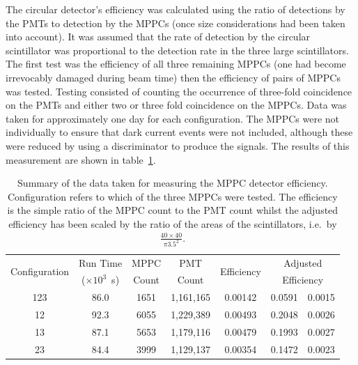 The circular detector's efficiency was calculated using the ratio of detections by the PMTs to detection by the MPPCs (once size considerations had been taken into account). It was assumed that the rate of detection by the circular scintillator was proportional to the detection rate in the three large scintillators. The first test was the efficiency of all three remaining MPPCs (one had become irrevocably damaged during beam time) then the efficiency of pairs of MPPCs was tested. Testing consisted of counting the occurrence of three-fold coincidence on the PMTs and either two or three fold coincidence on the MPPCs. Data was taken for approximately one day for each configuration. The MPPCs were not individually to ensure that dark current events were not included, although these were reduced by using a discriminator to produce the signals. The results of this measurement are shown in table~\ref{tab:music2_eff}.

\begin{table}
  \begin{center}
    \begin{tabular}{c | c | c | c | c | r@{~\( \pm \)~}l}
      \multirow{2}{*}{Configuration} 
                     &  Run Time             &  MPPC   &  PMT        &  \multirow{2}{*}{Efficiency} 
                                                                                    &  \multicolumn{2}{c}{Adjusted}   \\
                     &  (\(\times 10^3\)~s)  &  Count  &  Count      &              &  \multicolumn{2}{c}{Efficiency} \\
      \hline
      123            &  86.0                 &  1651   &  1,161,165  &  0.00142     &  0.0591 & 0.0015  \\
      12             &  92.3                 &  6055   &  1,229,389  &  0.00493     &  0.2048 & 0.0026  \\
      13             &  87.1                 &  5653   &  1,179,116  &  0.00479     &  0.1993 & 0.0027  \\
      23             &  84.4                 &  3999   &  1,129,137  &  0.00354     &  0.1472 & 0.0023  \\
        
    \end{tabular}
  \end{center}
  \caption{Summary of the data taken for measuring the MPPC detector efficiency. Configuration refers to which of the three MPPCs were tested. The efficiency is the simple ratio of the MPPC count to the PMT count whilst the adjusted efficiency has been scaled by the ratio of the areas of the scintillators, i.e.\ by \( \frac{40\times40}{\pi3.5^2} \).}
  \label{tab:music2_eff}
\end{table}

